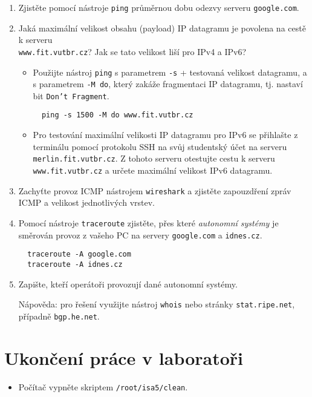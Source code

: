 \begin{enumerate}
  \item Zjistěte pomocí nástroje \texttt{ping} průměrnou dobu odezvy serveru \texttt{google.com}.
  \item Jaká maximální velikost obsahu (payload) IP datagramu je povolena na cestě k serveru\\ \texttt{www.fit.vutbr.cz}? Jak se tato velikost liší pro IPv4 a IPv6?
  \begin{itemize}
    \item Použijte nástroj {\tt ping} s parametrem \texttt{-s} + testovaná velikost datagramu, a s parametrem \texttt{-M do}, který zakáže fragmentaci IP datagramu, tj. nastaví bit \texttt{Don't Fragment}.
\begin{verbatim}
  ping -s 1500 -M do www.fit.vutbr.cz
\end{verbatim}
\item Pro testování maximální velikosti IP datagramu pro IPv6 se přihlašte z terminálu pomocí protokolu SSH na svůj studentský účet na serveru {\tt merlin.fit.vutbr.cz}. Z tohoto serveru otestujte cestu k serveru \texttt{www.fit.vutbr.cz} a určete maximální velikost IPv6 datagramu. 
  \end{itemize}
  \item Zachyťte provoz ICMP nástrojem {\tt wireshark} a zjistěte zapouzdření zpráv ICMP a velikost jednotlivých vrstev.
  \item Pomocí nástroje \texttt{traceroute} zjistěte, přes které {\em autonomní systémy} je směrován provoz z vašeho PC na servery \texttt{google.com} a \texttt{idnes.cz}.
\begin{verbatim}
  traceroute -A google.com
  traceroute -A idnes.cz
\end{verbatim}
  \item Zapište, kteří operátoři provozují dané autonomní systémy. 

  {\small Nápověda: pro řešení využijte nástroj {\tt whois} nebo stránky \texttt{stat.ripe.net}, případně \texttt{bgp.he.net}.}
\end{enumerate}

\section*{Ukončení práce v laboratoři}
\begin{itemize}
  \item Počítač vypněte skriptem {\tt /root/isa5/clean}.
\end{itemize}
